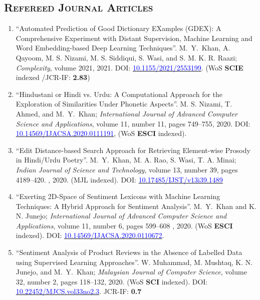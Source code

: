 \documentclass[a4paper, 10pt]{article}
\begin{document}
\subsection*{\normalfont\textsc{ Refereed Journal Articles}}
\begin{enumerate}
\itemsep-4pt 

	\item ``Automated Prediction of Good Dictionary EXamples (GDEX): A Comprehensive Experiment with Distant Supervision, Machine Learning and Word Embedding-based Deep Learning Techniques''. \textcolor{NavyBlue}{M.~Y.~Khan}, A. Qayoom, M. S. Nizami, M. S. Siddiqui, S. Wasi, and S. M. K. R. Raazi; \emph{Complexity}, volume 2021, 2021. DOI: \href{https://doi.org/10.1155/2021/2553199}{\textcolor{blue}{10.1155/2021/2553199}}. 
(WoS {\bfseries SCIE} indexed /JCR-IF: {\bfseries 2.83})
	
	\item ``Hindustani or Hindi vs. Urdu: A Computational Approach for the Exploration of Similarities Under Phonetic Aspects''. M. S. Nizami, T. Ahmed, and \textcolor{NavyBlue}{M.~Y.~Khan}; \emph{International Journal of Advanced Computer Science and Applications}, volume 11, number 11, pages  749--755, 2020. DOI: \href{https://dx.doi.org/10.14569/IJACSA.2020.0111191}{\textcolor{blue}{10.14569/IJACSA.2020.0111191}}, (WoS {\bfseries ESCI} indexed).
	
	\item ``Edit Distance-based Search Approach for Retrieving  Element-wise Prosody in Hindi/Urdu Poetry''. \textcolor{NavyBlue}{M.~Y.~Khan}, M. A. Rao, S. Wasi, T. A. Minai; \emph{Indian Journal of Science and Technology}, volume 13, number 39, pages  4189--420.
, 2020. (MJL indexed). DOI: \href{https://doi.org/10.17485/IJST/v13i39.1489}{\textcolor{blue}{10.17485/IJST/v13i39.1489}}

	\item ``Exerting 2D-Space of Sentiment Lexicons with Machine Learning Techniques: A Hybrid Approach for Sentiment Analysis''. \textcolor{NavyBlue}{M.~Y.~Khan} and K. N. Junejo; \emph{International Journal of Advanced Computer Science and Applications}, volume 11, number 6, pages 599--608
, 2020. (WoS {\bfseries ESCI} indexed). DOI: \href{https://doi.org/10.14569/IJACSA.2020.0110672}{\textcolor{blue}{10.14569/IJACSA.2020.0110672}}.
       
    \item ``Sentiment Analysis of Product Reviews in the Absence of Labelled Data using Supervised Learning Approaches''. W. Muhammad, M. Mushtaq, K. N. Junejo, and \textcolor{NavyBlue}{M.~Y.~Khan}; \emph{Malaysian Journal of Computer Science}, volume 32, number 2, pages 118--132, 2020. (WoS {\bfseries SCI} indexed). DOI: \href{https://doi.org/10.22452/mjcs.vol33no2.3}{\textcolor{blue}{10.22452/MJCS.vol33no2.3}}. JCR-IF: {\bfseries 0.7}
    

\end{enumerate}
\end{document}
